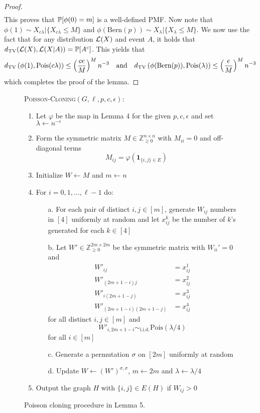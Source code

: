\documentclass[11pt]{article}
\begin{document}
\begin{proof}
\begin{align*}
\end{align*}
This proves that $\mathbb{P}[\phi(0) = m]$ is a well-defined PMF. Now note that $\phi(1) \sim X_{c\lambda} | \{X_{c\lambda} \le M\}$ and $\phi(\text{Bern}(p)) \sim X_{\lambda} | \{X_{\lambda} \le M\}$. We now use the fact that for any distribution $\mathcal{L}(X)$ and event $A$, it holds that $d_{\text{TV}}(\mathcal{L}(X), \mathcal{L}(X|A)) = \mathbb{P}[A^c]$. This yields that
$$d_{\text{TV}}\left(\phi(1), \text{Pois}(c\lambda) \right) \le \left(\frac{ce}{M} \right)^M n^{-3} \quad \text{and} \quad d_{\text{TV}}\left(\phi(\text{Bern}(p)), \text{Pois}(\lambda) \right) \le \left(\frac{e}{M} \right)^M n^{-3}$$
which completes the proof of the lemma.
\end{proof}

\begin{figure}[t!]
\begin{algbox}
\textsc{Poisson-Cloning}$(G, \ell, p, c, \epsilon)$:
\begin{enumerate}
\item Let $\varphi$ be the map in Lemma 4 for the given $p, c, \epsilon$ and set $\lambda \gets n^{-\epsilon}$
\item Form the symmetric matrix $M \in \mathbb{Z}_{\ge 0}^{n \times n}$ with $M_{ii} = 0$ and off-diagonal terms
$$M_{ij} = \varphi\left(\mathbf{1}_{\{i, j \} \in E}\right)$$
\item Initialize $W \gets M$ and $m \gets n$
\item For $i = 0, 1, \dots, \ell - 1$ do:
\begin{enumerate}
\item[a.] For each pair of distinct $i, j \in [m]$, generate $W_{ij}$ numbers in $[4]$ uniformly at random and let $x_{ij}^k$ be the number of $k$'s generated for each $k \in [4]$
\item[b.] Let $W' \in\mathbb{Z}_{\ge 0}^{2m \times 2m}$ be the symmetric matrix with $W_{ii}' = 0$ and
\begin{align*}
W'_{ij} &= x^1_{ij} \\
W'_{(2m+1 - i)j} &=  x^2_{ij} \\
W'_{i(2m + 1 - j)} &=  x^3_{ij} \\
W'_{(2m+1 - i)(2m + 1 - j)} &=  x^4_{ij}
\end{align*}
for all distinct $i, j \in [m]$ and
$$W'_{i, 2m+1 - i} \sim_{\text{i.i.d.}} \text{Pois}(\lambda/4)$$
for all $i \in [m]$
\item[c.] Generate a permutation $\sigma$ on $[2m]$ uniformly at random
\item[d.] Update $W \gets (W')^{\sigma, \sigma}$, $m \gets 2m$ and $\lambda \gets \lambda/4$
\end{enumerate}
\item Output the graph $H$ with $\{i, j \} \in E(H)$ if $W_{ij} > 0$
\end{enumerate}
\vspace{1mm}
\end{algbox}
\caption{Poisson cloning procedure in Lemma 5.}
\end{figure}
\end{document}
